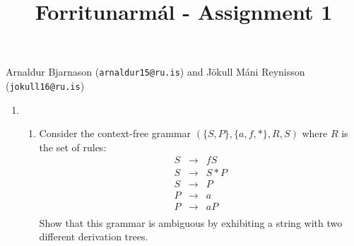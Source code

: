 \documentclass[12pt]{article}
\begin{document}

\title{Forritunarmál - Assignment 1}
\maketitle
{\small{\sc\noindent
        Arnaldur Bjarnason ({\tt arnaldur15@ru.is}) and Jökull Máni Reynisson ({\tt jokull16@ru.is})
}}

\begin{enumerate}
\item
  \begin{enumerate}
  \item Consider the context-free grammar $(\{S,P\},\{a,f,*\},R,S)$ where $R$ is the set of rules:
  \[
    \begin{array}{lll}
      S & \rightarrow & fS \\
      S & \rightarrow & S*P \\
      S & \rightarrow & P \\
      P & \rightarrow & a \\
      P & \rightarrow & aP \\
    \end{array}
  \]
  Show that this grammar is ambiguous by exhibiting a string with two different derivation trees.


\end{enumerate}
\end{enumerate}
\end{document}
